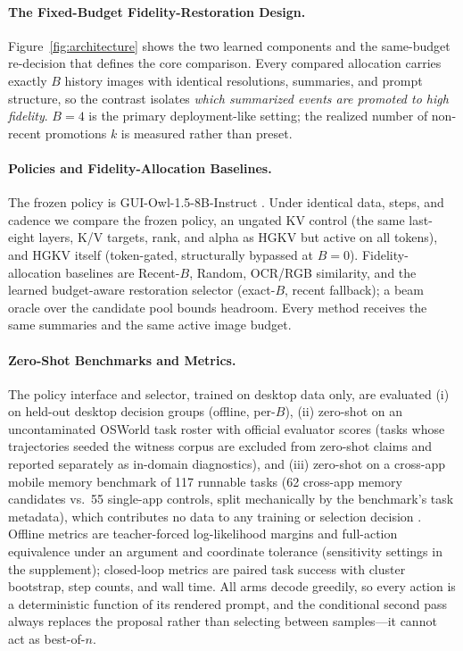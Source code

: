 \documentclass[letterpaper]{article} %
\newcommand{\hgkv}{\textsc{HGKV}}
\begin{document}
\paragraph{The Fixed-Budget Fidelity-Restoration Design.}

Figure~\ref{fig:architecture} shows the two learned components and the
same-budget re-decision that defines the core comparison.
Every compared allocation carries exactly $B$ history images with
identical resolutions, summaries, and prompt structure, so the contrast
isolates \emph{which summarized events are promoted to high fidelity}.
$B{=}4$ is the primary deployment-like setting; the realized number of
non-recent promotions $k$ is measured rather than preset.

\paragraph{Policies and Fidelity-Allocation Baselines.}

The frozen policy is GUI-Owl-1.5-8B-Instruct \citep{xu2026mobileagent35}.
Under identical data, steps, and cadence we compare the frozen policy, an
ungated KV control (the same last-eight layers, K/V targets, rank, and
alpha as \hgkv{} but active on all tokens), and \hgkv{} itself
(token-gated, structurally bypassed at $B{=}0$).
Fidelity-allocation baselines are Recent-$B$, Random, OCR/RGB similarity, and
the learned budget-aware restoration selector (exact-$B$, recent fallback); a
beam oracle over the candidate pool bounds headroom. Every method receives the
same summaries and the same active image budget.

\paragraph{Zero-Shot Benchmarks and Metrics.}

The policy interface and selector, trained on desktop data only, are evaluated
(i) on held-out desktop decision groups (offline, per-$B$), (ii) zero-shot on
an uncontaminated OSWorld task roster \citep{xie2024osworld} with official
evaluator scores (tasks whose trajectories seeded the witness corpus are
excluded from zero-shot claims and reported separately as in-domain
diagnostics), and (iii) zero-shot on a cross-app mobile memory benchmark of
117 runnable tasks (62 cross-app memory candidates vs.\ 55 single-app
controls, split mechanically by the benchmark's task metadata),
which contributes no data to any training or selection decision
\citep{kong2026mobileworld}.
Offline metrics are teacher-forced log-likelihood margins and full-action
equivalence under an argument and coordinate tolerance (sensitivity settings
in the supplement); closed-loop metrics are paired task success with
cluster bootstrap, step counts, and wall time. All arms decode greedily,
so every action is a deterministic function of its rendered prompt, and
the conditional second pass always replaces the proposal rather than
selecting between samples---it cannot act as best-of-$n$.
\end{document}
